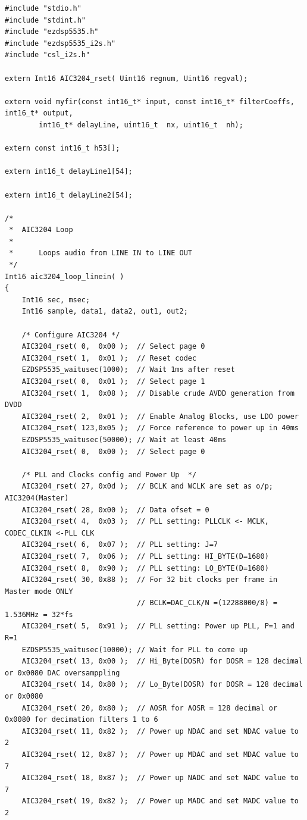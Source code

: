 \documentclass[11pt,pdftex,portrait,letterpaper]{article}
\begin{document}
\pagebreak

\begin{lstlisting}[caption={aic3204 audio loop}, label=l:aic3204]
#include "stdio.h"
#include "stdint.h"
#include "ezdsp5535.h"
#include "ezdsp5535_i2s.h"
#include "csl_i2s.h"

extern Int16 AIC3204_rset( Uint16 regnum, Uint16 regval);

extern void myfir(const int16_t* input, const int16_t* filterCoeffs, int16_t* output,
		int16_t* delayLine, uint16_t  nx, uint16_t  nh);

extern const int16_t h53[];

extern int16_t delayLine1[54];

extern int16_t delayLine2[54];

/*
 *  AIC3204 Loop
 * 
 *      Loops audio from LINE IN to LINE OUT
 */
Int16 aic3204_loop_linein( )
{
    Int16 sec, msec;
    Int16 sample, data1, data2, out1, out2;
     
    /* Configure AIC3204 */
    AIC3204_rset( 0,  0x00 );  // Select page 0
    AIC3204_rset( 1,  0x01 );  // Reset codec
    EZDSP5535_waitusec(1000);  // Wait 1ms after reset
    AIC3204_rset( 0,  0x01 );  // Select page 1
    AIC3204_rset( 1,  0x08 );  // Disable crude AVDD generation from DVDD
    AIC3204_rset( 2,  0x01 );  // Enable Analog Blocks, use LDO power
    AIC3204_rset( 123,0x05 );  // Force reference to power up in 40ms
    EZDSP5535_waitusec(50000); // Wait at least 40ms
    AIC3204_rset( 0,  0x00 );  // Select page 0
    
    /* PLL and Clocks config and Power Up  */
    AIC3204_rset( 27, 0x0d );  // BCLK and WCLK are set as o/p; AIC3204(Master)
    AIC3204_rset( 28, 0x00 );  // Data ofset = 0
    AIC3204_rset( 4,  0x03 );  // PLL setting: PLLCLK <- MCLK, CODEC_CLKIN <-PLL CLK
    AIC3204_rset( 6,  0x07 );  // PLL setting: J=7
    AIC3204_rset( 7,  0x06 );  // PLL setting: HI_BYTE(D=1680)
    AIC3204_rset( 8,  0x90 );  // PLL setting: LO_BYTE(D=1680)
    AIC3204_rset( 30, 0x88 );  // For 32 bit clocks per frame in Master mode ONLY
                               // BCLK=DAC_CLK/N =(12288000/8) = 1.536MHz = 32*fs
    AIC3204_rset( 5,  0x91 );  // PLL setting: Power up PLL, P=1 and R=1
    EZDSP5535_waitusec(10000); // Wait for PLL to come up    
    AIC3204_rset( 13, 0x00 );  // Hi_Byte(DOSR) for DOSR = 128 decimal or 0x0080 DAC oversamppling
    AIC3204_rset( 14, 0x80 );  // Lo_Byte(DOSR) for DOSR = 128 decimal or 0x0080
    AIC3204_rset( 20, 0x80 );  // AOSR for AOSR = 128 decimal or 0x0080 for decimation filters 1 to 6
    AIC3204_rset( 11, 0x82 );  // Power up NDAC and set NDAC value to 2
    AIC3204_rset( 12, 0x87 );  // Power up MDAC and set MDAC value to 7
    AIC3204_rset( 18, 0x87 );  // Power up NADC and set NADC value to 7
    AIC3204_rset( 19, 0x82 );  // Power up MADC and set MADC value to 2
    

\end{lstlisting}
\end{document}

